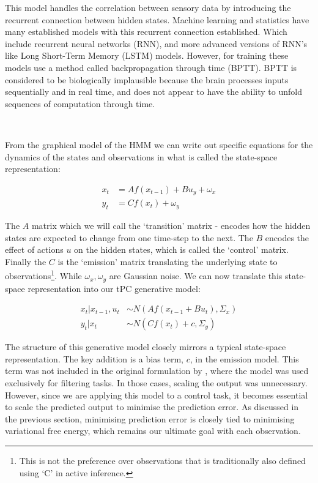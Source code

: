 \documentclass{article}
\begin{document}
This model handles the correlation between sensory data by introducing the recurrent connection between hidden states. Machine learning and statistics have many established models with this recurrent connection established. Which include recurrent neural networks (RNN), and more advanced versions of RNN's like  Long Short-Term Memory (LSTM) models. However, for training these models use a method called backpropagation through time (BPTT). BPTT is considered to be biologically implausible because the brain processes inputs sequentially and in real time, and does not appear to have the ability to unfold sequences of computation through time. \citep{millidge2024temporal}

\

From the graphical model of the HMM we can write out specific equations for the dynamics of the states and observations in what is called the state-space representation:

\begin{equation}\label{eq:tpc}
	\begin{aligned}
		x_t &= A f(x_{t-1}) + B u_y + \omega_x \\
		y_t &= C f(x_t) + \omega_y
	\end{aligned}
\end{equation}

The $A$ matrix which we will call the `transition' matrix - encodes how the hidden states are expected to change from one time-step to the next. The $B$  encodes the effect of actions $u$ on the hidden states, which is called the `control' matrix. Finally the $C$ is the `emission' matrix translating the underlying state to observations\footnote{This is not the preference over observations that is traditionally also defined using `C' in active inference.}. While $\omega_x, \omega_y$ are Gaussian noise. We can now translate this state-space representation into our tPC generative model:

\begin{equation}
\begin{aligned}
	x_t | x_{t-1}, u_{t} &\sim N( A f(x_{t-1} + B u_{t}), \Sigma_x) \\
	y_t | x_t &\sim N( C f(x_t) + c, \Sigma_y)
\end{aligned}
\end{equation}

The structure of this generative model closely mirrors a typical state-space representation. The key addition is a bias term, $c$, in the emission model. This term was not included in the original formulation by \citet{millidge2024temporal}, where the model was used exclusively for filtering tasks. In those cases, scaling the output was unnecessary. However, since we are applying this model to a control task, it becomes essential to scale the predicted output to minimise the prediction error. As discussed in the previous section, minimising prediction error is closely tied to minimising variational free energy, which remains our ultimate goal with each observation.
\end{document}

